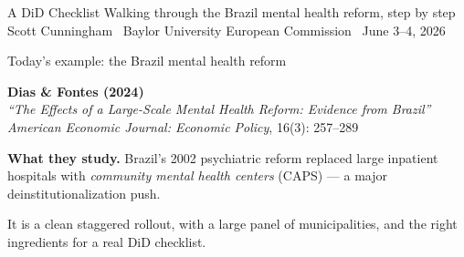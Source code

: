 \documentclass[aspectratio=169,12pt,t]{beamer}
\begin{document}

\codechellatitle
  {A DiD Checklist}
  {Walking through the Brazil mental health reform, step by step}
  {Scott Cunningham \textperiodcentered\ Baylor University}
  {European Commission \textperiodcentered\ June 3--4, 2026}


\begin{frame}{Today's example: the Brazil mental health reform}
\vspace{0.5cm}

\textbf{Dias \& Fontes (2024)} \\
\textit{``The Effects of a Large-Scale Mental Health Reform: Evidence from Brazil''} \\
\textit{American Economic Journal: Economic Policy}, 16(3): 257--289

\vspace{0.7cm}

\textbf{What they study.} \;Brazil's 2002 psychiatric reform replaced large inpatient hospitals with \textit{community mental health centers} (CAPS) --- a major deinstitutionalization push.

\vspace{0.4cm}

 \;It is a clean staggered rollout, with a large panel of municipalities, and the right ingredients for a real DiD checklist.
\end{frame}
\end{document}
